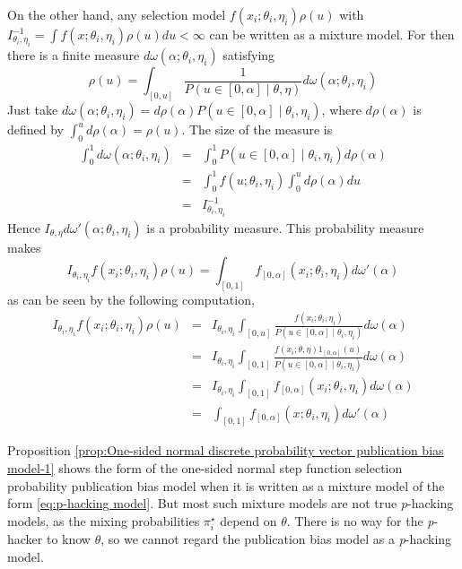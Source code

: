 \documentclass{article}
\theoremstyle{plain}
\theoremstyle{definition}
\begin{document}
On the other hand, any selection model $f\left(x_{i};\theta_{i},\eta_{i}\right)\rho\left(u\right)$ with $I_{\theta_{i},\eta_{i}}^{-1}=\int f\left(x;\theta_{i},\eta_{i}\right)\rho\left(u\right)du<\infty$ can be written as a mixture model. For then there is a finite measure $d\omega\left(\alpha;\theta_{i},\eta_{i}\right)$ satisfying 
\[
\rho\left(u\right)=\int_{[0,u]}\frac{1}{P\left(u\in\left[0,\alpha\right]\mid\theta,\eta\right)}d\omega\left(\alpha;\theta_{i},\eta_{i}\right)
\]
Just take $d\omega\left(\alpha;\theta_{i},\eta_{i}\right)=d\rho\left(\alpha\right)P\left(u\in\left[0,\alpha\right]\mid\theta_{i},\eta_{i}\right)$, where $d\rho\left(\alpha\right)$ is defined by $\int_{0}^{u}d\rho\left(\alpha\right)=\rho\left(u\right)$. The size of the measure is
\begin{eqnarray*}
\int_{0}^{1}d\omega\left(\alpha;\theta_{i},\eta_{i}\right) & = & \int_{0}^{1}P\left(u\in\left[0,\alpha\right]\mid\theta_{i},\eta_{i}\right)d\rho\left(\alpha\right)\\
 & = & \int_{0}^{1}f\left(u;\theta_{i},\eta_{i}\right)\int_{0}^{u}d\rho\left(\alpha\right)du\\
 & = & I_{\theta_{i},\eta_{i}}^{-1}
\end{eqnarray*}
Hence $I_{\theta,\eta}d\omega'\left(\alpha;\theta_{i},\eta_{i}\right)$ is a probability measure. This probability measure makes 
\[
I_{\theta_{i},\eta_{i}}f\left(x_{i};\theta_{i},\eta_{i}\right)\rho\left(u\right)=\int_{[0,1]}f_{\left[0,\alpha\right]}\left(x_{i};\theta_{i},\eta_{i}\right)d\omega'\left(\alpha\right)
\]
as can be seen by the following computation,
\begin{eqnarray*}
I_{\theta_{i},\eta_{i}}f\left(x_{i};\theta_{i},\eta_{i}\right)\rho\left(u\right) & = & I_{\theta_{i},\eta_{i}}\int_{[0,u]}\frac{f\left(x_{i};\theta_{i},\eta_{i}\right)}{P\left(u\in\left[0,\alpha\right]\mid\theta_{i},\eta_{i}\right)}d\omega\left(\alpha\right)\\
 & = & I_{\theta_{i},\eta_{i}}\int_{[0,1]}\frac{f\left(x_{i};\theta,\eta\right)1_{\left[0,\alpha\right]}\left(u\right)}{P\left(u\in\left[0,\alpha\right]\mid\theta_{i},\eta_{i}\right)}d\omega\left(\alpha\right)\\
 & = & I_{\theta_{i},\eta_{i}}\int_{[0,1]}f_{\left[0,\alpha\right]}\left(x_{i};\theta_{i},\eta_{i}\right)d\omega\left(\alpha\right)\\
 & = & \int_{[0,1]}f_{\left[0,\alpha\right]}\left(x;\theta_{i},\eta_{i}\right)d\omega'\left(\alpha\right)
\end{eqnarray*}

Proposition \ref{prop:One-sided normal discrete probability vector publication bias model-1} shows the form of the one-sided normal step function selection probability publication bias model when it is written as a mixture model of the form \eqref{eq:p-hacking model}. But most such mixture models are not true \textit{p}-hacking models, as the mixing probabilities $\pi_{i}^{\star}$ depend on $\theta$. There is no way for the \textit{p}-hacker to know
$\theta$, so we cannot regard the publication bias model as a \textit{p}-hacking model.





\label{lastpage}
\end{document}
